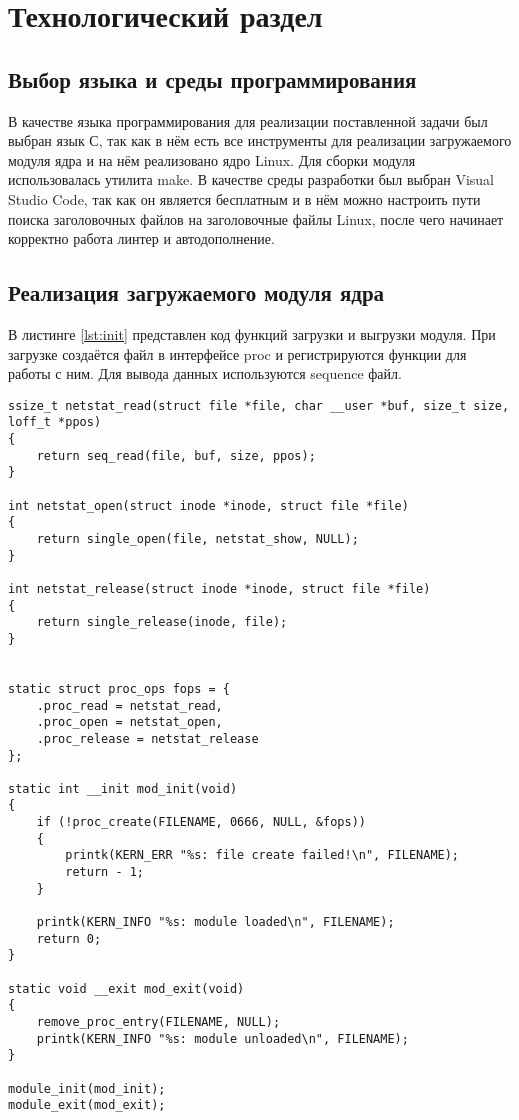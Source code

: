 \chapter{Технологический раздел}

\section{Выбор языка и среды программирования}

В качестве языка программирования для реализации поставленной задачи был выбран язык С, так как в нём есть все инструменты для реализации загружаемого модуля ядра и на нём реализовано ядро Linux. Для сборки модуля использовалась утилита make. В качестве среды разработки был выбран Visual Studio Code, так как он является бесплатным и в нём можно настроить пути поиска заголовочных файлов на заголовочные файлы Linux, после чего начинает корректно работа линтер и автодополнение.

\section{Реализация загружаемого модуля ядра}

В листинге \ref{lst:init} представлен код функций загрузки и выгрузки модуля. При загрузке создаётся файл в интерфейсе proc и регистрируются функции для работы с ним. Для вывода данных используются sequence файл.
 
\begin{center}
	\captionsetup{justification=raggedright,singlelinecheck=off}
	\begin{lstlisting}[label=lst:init,caption=Функции инциализации и выгрузки модуля ,showstringspaces=false]
ssize_t netstat_read(struct file *file, char __user *buf, size_t size, loff_t *ppos)
{	
	return seq_read(file, buf, size, ppos);
}

int netstat_open(struct inode *inode, struct file *file)
{
	return single_open(file, netstat_show, NULL);
}

int netstat_release(struct inode *inode, struct file *file)
{
	return single_release(inode, file);
}


static struct proc_ops fops = {
	.proc_read = netstat_read,
	.proc_open = netstat_open,
	.proc_release = netstat_release
};

static int __init mod_init(void)
{
	if (!proc_create(FILENAME, 0666, NULL, &fops))
	{
		printk(KERN_ERR "%s: file create failed!\n", FILENAME);
		return - 1;
	}
	
	printk(KERN_INFO "%s: module loaded\n", FILENAME);
	return 0;
}

static void __exit mod_exit(void)
{
	remove_proc_entry(FILENAME, NULL);
	printk(KERN_INFO "%s: module unloaded\n", FILENAME);
}

module_init(mod_init);
module_exit(mod_exit);
	\end{lstlisting}
\end{center}
\FloatBarrier

